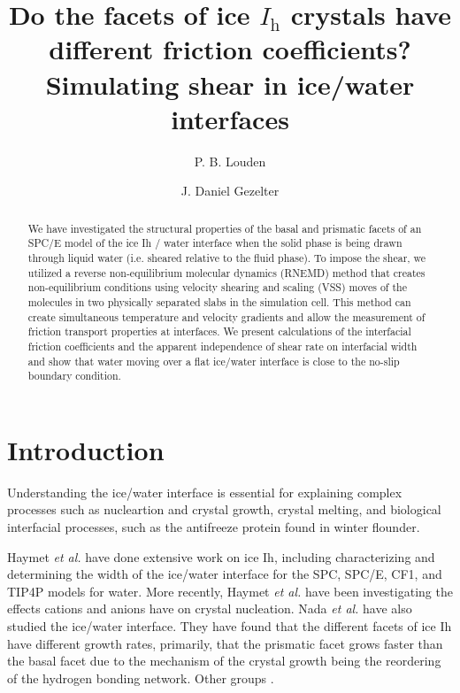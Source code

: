 \documentclass[journal = jpccck, manuscript = article]{achemso}
\title{Do the facets of ice $I_\mathrm{h}$ crystals have different
  friction coefficients?  Simulating shear in ice/water interfaces}
\author{P. B. Louden}
\author{J. Daniel Gezelter}
\affiliation[University of Notre Dame]{251 Nieuwland Science Hall\\
  Department of Chemistry and Biochemistry\\ University of Notre
  Dame\\ Notre Dame, Indiana 46556}
\begin{document}
\begin{abstract}
We have investigated the structural properties of the basal and
prismatic facets of an SPC/E model of the ice Ih / water interface
when the solid phase is being drawn through liquid water (i.e. sheared
relative to the fluid phase). To impose the shear, we utilized a
reverse non-equilibrium molecular dynamics (RNEMD) method that creates
non-equilibrium conditions using velocity shearing and scaling (VSS)
moves of the molecules in two physically separated slabs in the
simulation cell. This method can create simultaneous temperature and
velocity gradients and allow the measurement of friction transport
properties at interfaces. We present calculations of the interfacial
friction coefficients and the apparent independence of shear rate on
interfacial width and show that water moving over a flat ice/water
interface is close to the no-slip boundary condition.
\end{abstract}

\newpage

\section{Introduction}



Understanding the ice/water interface is essential for explaining complex processes such as nucleartion and crystal growth\cite{Han92,Granasy95,Vanfleet95}, crystal melting\cite{Weber83,Han92,Sakai96,Sakai96B}, and biological interfacial processes, such as the antifreeze protein found in winter flounder\cite{Wierzbicki07, Chapsky97}. 

Haymet \emph{et al.} have done extensive work on ice Ih, including characterizing and determining the width of the ice/water interface for the SPC, SPC/E, CF1, and TIP4P models for water. \cite{Karim87,Karim88,Karim90,Hayward01,Bryk02,Hayward02,Gay02} More recently, Haymet \emph{et al.} have been investigating the effects cations and anions have on crystal nucleation\cite{Bryk04,Smith05,Wilson08,Wilson10}. Nada \emph{et al.} have also studied the ice/water interface\cite{Nada95,Nada00,Nada03,Nada12}. They have found that the different facets of ice Ih have different growth rates, primarily, that the prismatic facet grows faster than the basal facet due to the mechanism of the crystal growth being the reordering of the hydrogen bonding network\cite{Nada05}. Other groups \cite{Baez95,Arbuckle02,}.
\end{document}
